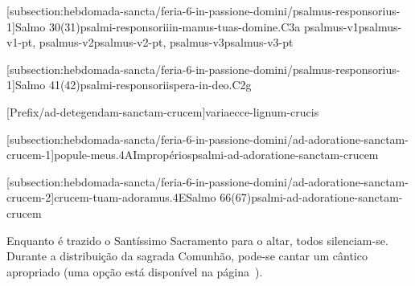 \def\Prefix{subsection:hebdomada-sancta/feria-6-in-passione-domini}

[\Prefix/psalmus-responsorius-1]{Salmo 30(31)}{psalmi-responsorii}{in-manus-tuas-domine.C3a}{
  {psalmus-v1}{psalmus-v1-pt},
  {psalmus-v2}{psalmus-v2-pt},
  {psalmus-v3}{psalmus-v3-pt}
}

[\Prefix/psalmus-responsorius-1]{Salmo 41(42)}{psalmi-responsorii}{spera-in-deo.C2g}

\AllowPageFlush

[Prefix/ad-detegendam-sanctam-crucem]{}{varia}{ecce-lignum-crucis}

[\Prefix/ad-adoratione-sanctam-crucem-1]{popule-meus.4A}{Impropérios}{psalmi-ad-adoratione-sanctam-crucem}

[\Prefix/ad-adoratione-sanctam-crucem-2]{crucem-tuam-adoramus.4E}{Salmo 66(67)}{psalmi-ad-adoratione-sanctam-crucem}

\begin{rubrica}
  Enquanto é trazido o Santíssimo Sacramento para o altar, todos silenciam-se. Durante a distribuição da sagrada Comunhão, pode-se cantar um cântico apropriado (uma opção está disponível na página~\pageref{appendix:feria-6-in-passio-domini/communio}).
\end{rubrica}